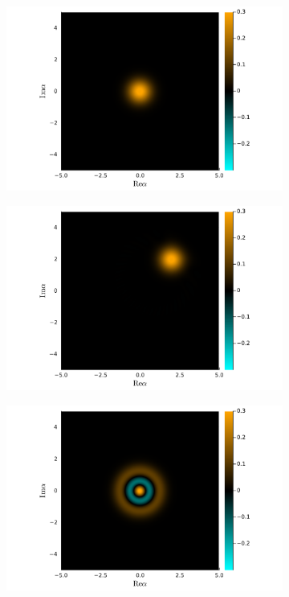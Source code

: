 \documentclass[hyperref, a4paper]{article}
\begin{document}
\begin{figure}
    \centering
    \begin{subfigure}{0.45\textwidth}
        \centering
        \includegraphics[width=\textwidth]{heatmaps/coherent-state.pdf}
        \subcaption{}
    \end{subfigure}
    \begin{subfigure}{0.45\textwidth}
        \centering
        \includegraphics[width=\textwidth]{heatmaps/coherent-state2.pdf}
        \subcaption{}
    \end{subfigure}
    \begin{subfigure}{0.45\textwidth}
        \centering
        \includegraphics[width=\textwidth]{heatmaps/fock-state.pdf}

\end{subfigure}
\end{figure}
\end{document}
